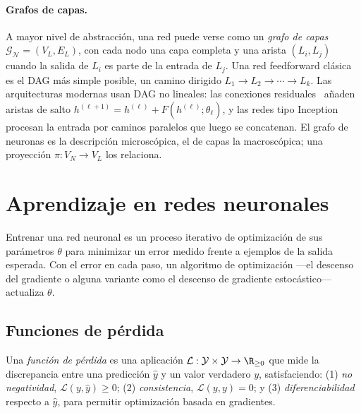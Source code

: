 \paragraph{Grafos de capas.}
A mayor nivel de abstracci\'on, una red puede verse como un \emph{grafo de capas}
$\mathcal{G}_{\mathcal{N}} = (V_L, E_L)$, con cada nodo una capa completa y una
arista $(L_i, L_j)$ cuando la salida de $L_i$ es parte de la entrada de $L_j$. Una
red feedforward cl\'asica es el DAG m\'as simple posible, un camino dirigido $L_1
\to L_2 \to \cdots \to L_k$. Las arquitecturas modernas usan DAG no lineales: las
conexiones residuales~\citep{he2016deep} a\~naden aristas de salto $h^{(\ell+1)} =
h^{(\ell)} + F(h^{(\ell)}; \theta_\ell)$, y las redes tipo
Inception~\citep{szegedy2015going} procesan la entrada por caminos paralelos que
luego se concatenan. El grafo de neuronas es la descripci\'on microsc\'opica, el de
capas la macrosc\'opica; una proyecci\'on $\pi : V_N \to V_L$ los relaciona.

\section{Aprendizaje en redes neuronales}
\label{sec:found:learning}

Entrenar una red neuronal es un proceso iterativo de optimizaci\'on de sus
par\'ametros $\theta$ para minimizar un error medido frente a ejemplos de la
salida esperada. Con el error en cada paso, un algoritmo de optimizaci\'on ---el
descenso del gradiente o alguna variante como el descenso de gradiente
estoc\'astico--- actualiza $\theta$.

\subsection{Funciones de p\'erdida}
\label{sec:found:loss}

\begin{definition}
\label{def:found:loss}
Una \emph{funci\'on de p\'erdida} es una aplicaci\'on $\mathcal{L} : \mathcal{Y}
\times \mathcal{Y} \to \R_{\ge 0}$ que mide la discrepancia entre una predicci\'on
$\hat{y}$ y un valor verdadero $y$, satisfaciendo: (1) \emph{no negatividad},
$\mathcal{L}(y, \hat{y}) \ge 0$; (2) \emph{consistencia}, $\mathcal{L}(y, y) = 0$;
y (3) \emph{diferenciabilidad} respecto a $\hat{y}$, para permitir optimizaci\'on
basada en gradientes.
\end{definition}

